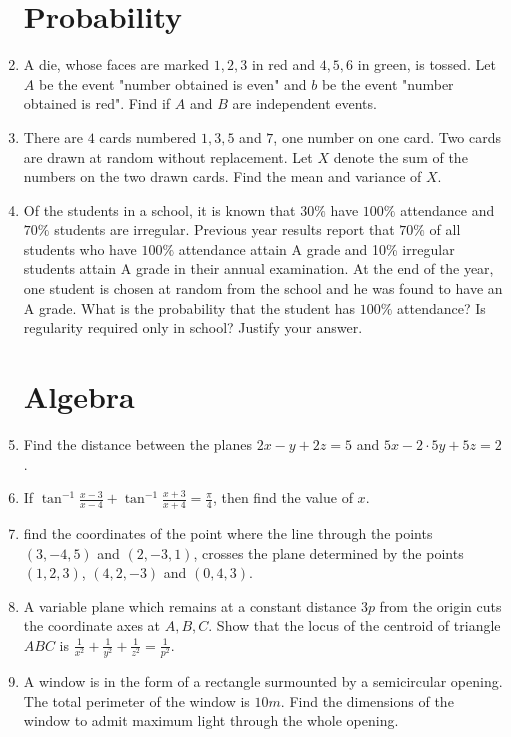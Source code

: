\documentclass[10pt,-letter paper]{article}
\providecommand{\brak}[1]{\ensuremath{\left(#1\right)}}
\begin{document}
\begin{enumerate}
\section{Probability}
\item A die, whose faces are marked $1, 2, 3$ in red and $4, 5, 6$ in green, is tossed. Let $A$ be the event "number obtained is even" and $b$ be the event "number obtained is red". Find if $A$ and $B$ are independent events.
\item There are $4$ cards numbered $1,3,5$ and $7$, one number on one card. Two cards are drawn at random without replacement. Let $X$ denote the sum of the numbers on the two drawn cards. Find the mean and variance of $X$.
\item Of the students in a school, it is known that $30\%$ have $100\%$ attendance and $70\%$ students are irregular. Previous year results report that $70\%$ of all students who have $100\%$ attendance attain A grade and 10\% irregular students attain A grade in their annual examination. At the end of the year, one student is chosen at random from the school and he was found to have an A grade. What is the probability that the student has $100\%$ attendance? Is regularity required only in school? Justify your answer.
\section{Algebra}
\item Find the distance between the planes $2x-y+2z= 5$ and $5x-2\cdot5y+5z = 2$.
\item If $\tan ^{-1}{\frac{x-3}{x-4}}+{\tan ^{-1}\frac{x+3}{x+4}=\frac{\pi}{4}}$, then find the value of $x$.
\item find the coordinates of the point where the line through the points $\brak{3, -4, 5}$ and $\brak {2, -3, 1}$, crosses the plane determined by the points $\brak{1, 2, 3}$, $\brak{4, 2, -3}$ and $\brak{0, 4, 3}$.
\item A variable plane which remains at a constant distance $3p$ from the origin cuts the coordinate axes at $A, B, C$. Show that the locus of the centroid of triangle  $ABC$ is $\frac{1}{{x}^{2}}+\frac{1}{{y}^{2}}+\frac{1}{{z}^{2}} = \frac{1}{{p}^{2}}$.
\item A window is in the form of a rectangle surmounted by a semicircular opening. The total perimeter of the window is $10m$. Find the dimensions of the window to admit maximum light through the whole opening.

\end{enumerate}
\end{document}
